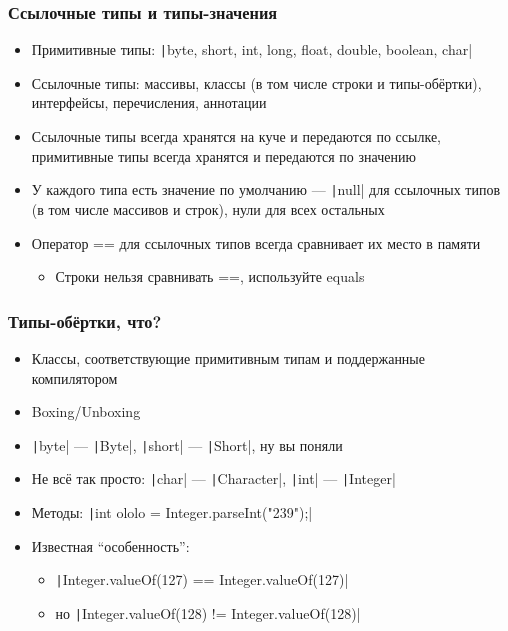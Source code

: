 \documentclass[xetex,mathserif,serif]{beamer}
\begin{document}
	\begin{frame}
		\frametitle{Ссылочные типы и типы-значения}
		\begin{itemize}
			\item Примитивные типы: \texttt|byte, short, int, long, float, double, boolean, char|
			\item Ссылочные типы: массивы, классы (в том числе строки и типы-обёртки), интерфейсы, перечисления, аннотации
			\item Ссылочные типы всегда хранятся на куче и передаются по ссылке, примитивные типы всегда хранятся и передаются по значению
			\item У каждого типа есть значение по умолчанию --- \texttt|null| для ссылочных типов (в том числе массивов и строк), нули для всех остальных
			\item Оператор == для ссылочных типов всегда сравнивает их место в памяти
			\begin{itemize}
				\item Строки нельзя сравнивать ==, используйте equals
			\end{itemize}
		\end{itemize}
	\end{frame}

	\begin{frame}
		\frametitle{Типы-обёртки, что?}
		\begin{itemize}
			\item Классы, соответствующие примитивным типам и поддержанные компилятором
			\item Boxing/Unboxing
			\item \texttt|byte| --- \texttt|Byte|, \texttt|short| --- \texttt|Short|, ну вы поняли
			\item Не всё так просто: \texttt|char| --- \texttt|Character|, \texttt|int| --- \texttt|Integer|
			\item Методы: \texttt|int ololo = Integer.parseInt("239");|
			\item Известная ``особенность'':
			\begin{itemize}
				\item \texttt|Integer.valueOf(127) == Integer.valueOf(127)|
				\item но \texttt|Integer.valueOf(128) != Integer.valueOf(128)|
			\end{itemize}
		\end{itemize}
	\end{frame}
\end{document}
